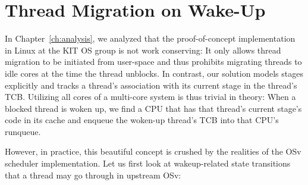 \documentclass[12pt,a4paper]{book}
\begin{document}
\section{Thread Migration on Wake-Up}\label{ch:di:wake}
In Chapter~\ref{ch:analysis}, we analyzed that the proof-of-concept implementation in Linux at the KIT OS group is not work conserving:
It only allows thread migration to be initiated from user-space and thus prohibits migrating threads to idle cores at the time the thread unblocks.
In contrast, our solution models stages explicitly and tracks a thread's association with its current stage in the thread's TCB.
Utilizing all cores of a multi-core system is thus trivial in theory:
When a blocked thread is woken up, we find a CPU that has that thread's current stage's code in its cache and enqueue the woken-up thread's TCB into that CPU's runqueue.

However, in practice, this beautiful concept is crushed by the realities of the OSv scheduler implementation.
Let us first look at wakeup-related state transitions that a thread may go through in upstream OSv:
\end{document}
